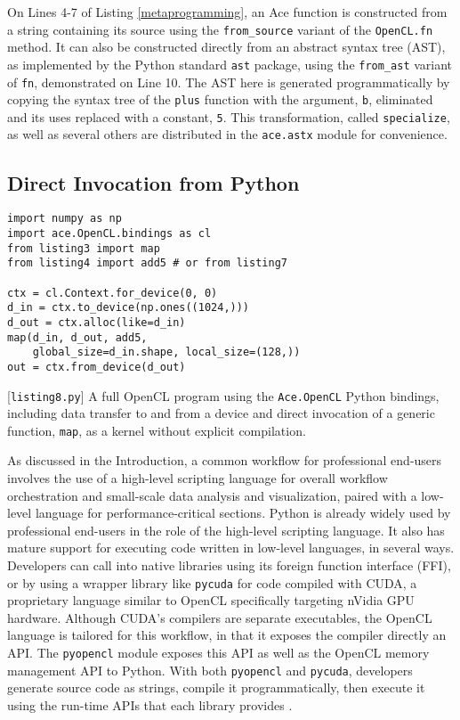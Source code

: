 \documentclass[10pt, conference, compsocconf]{IEEEtran}
\begin{document}
On Lines 4-7 of Listing \ref{metaprogramming}, an Ace function is constructed from a string containing its source using the \verb|from_source| variant of the \verb|OpenCL.fn| method. It can also be constructed directly from an abstract syntax tree (AST), as implemented by the Python standard \verb|ast| package, using the \verb|from_ast| variant of \verb|fn|, demonstrated on Line 10. The AST here is generated programmatically by copying the syntax tree of the \verb|plus| function with the argument, \verb|b|, eliminated and its uses replaced with a constant, \verb|5|. This transformation, called \verb|specialize|, as well as several others are distributed in the \verb|ace.astx| module for convenience.
\subsection{Direct Invocation from Python}\label{direct}

\begin{codelisting}
\begin{lstlisting}
import numpy as np
import ace.OpenCL.bindings as cl
from listing3 import map
from listing4 import add5 # or from listing7

ctx = cl.Context.for_device(0, 0)
d_in = ctx.to_device(np.ones((1024,)))
d_out = ctx.alloc(like=d_in)
map(d_in, d_out, add5, 
    global_size=d_in.shape, local_size=(128,))
out = ctx.from_device(d_out)
\end{lstlisting}
\caption{[\texttt{listing8.py}] A full OpenCL program using the \texttt{Ace.OpenCL} Python bindings, including data transfer to and from a device and direct invocation of a generic function, \texttt{map}, as a kernel without explicit compilation.}
\label{py}
\end{codelisting}

As discussed in the Introduction, a common workflow for professional end-users involves the use of a high-level scripting language for overall workflow orchestration and small-scale data analysis and visualization, paired with a low-level language for performance-critical sections. Python is already widely used by professional end-users in the role of the high-level scripting language. It also has mature support for executing code written in low-level languages, in several ways. Developers can call into native libraries using its foreign function interface (FFI),  or by using a wrapper library like \verb|pycuda| for code compiled with CUDA, a proprietary language similar to OpenCL specifically targeting nVidia GPU hardware. 
Although CUDA's compilers are separate executables, the OpenCL language is tailored for this workflow, in that it exposes the compiler directly an API. The \verb|pyopencl| module exposes this API as well as the OpenCL memory management API to Python. With both \verb|pyopencl| and \verb|pycuda|, developers generate source code as strings, compile it programmatically, then execute it using the run-time APIs that each library provides \cite{pyopencl}.
\end{document}

